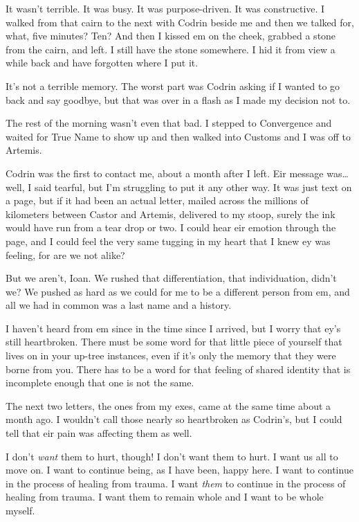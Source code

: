 It wasn't terrible. It was busy. It was purpose-driven. It was constructive. I walked from that cairn to the next with Codrin beside me and then we talked for, what, five minutes? Ten? And then I kissed em on the cheek, grabbed a stone from the cairn, and left. I still have the stone somewhere. I hid it from view a while back and have forgotten where I put it.

It's not a terrible memory. The worst part was Codrin asking if I wanted to go back and say goodbye, but that was over in a flash as I made my decision not to.

The rest of the morning wasn't even that bad. I stepped to Convergence and waited for True Name to show up and then walked into Customs and I was off to Artemis.

Codrin was the first to contact me, about a month after I left. Eir message was\ldots well, I said tearful, but I'm struggling to put it any other way. It was just text on a page, but if it had been an actual letter, mailed across the millions of kilometers between Castor and Artemis, delivered to my stoop, surely the ink would have run from a tear drop or two. I could hear eir emotion through the page, and I could feel the very same tugging in my heart that I knew ey was feeling, for are we not alike?

But we aren't, Ioan. We rushed that differentiation, that individuation, didn't we? We pushed as hard as we could for me to be a different person from em, and all we had in common was a last name and a history.

I haven't heard from em since in the time since I arrived, but I worry that ey's still heartbroken. There must be some word for that little piece of yourself that lives on in your up-tree instances, even if it's only the memory that they were borne from you. There has to be a word for that feeling of shared identity that is incomplete enough that one is not the same.

The next two letters, the ones from my exes, came at the same time about a month ago. I wouldn't call those nearly so heartbroken as Codrin's, but I could tell that eir pain was affecting them as well.

I don't \emph{want} them to hurt, though! I don't want them to hurt. I want us all to move on. I want to continue being, as I have been, happy here. I want to continue in the process of healing from trauma. I want \emph{them} to continue in the process of healing from trauma. I want them to remain whole and I want to be whole myself.

